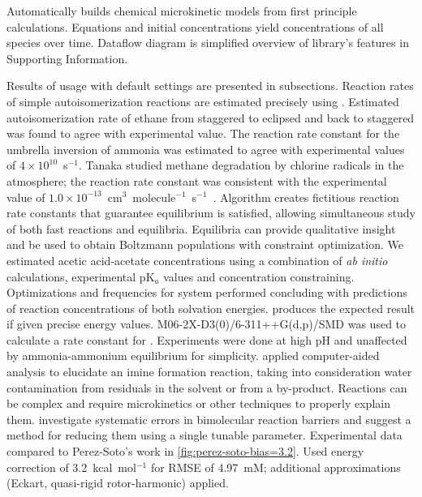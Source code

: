 Automatically builds chemical microkinetic models from first principle calculations.
Equations and initial concentrations yield concentrations of all species over time.
Dataflow diagram is simplified overview of library's features in Supporting Information.

Results of \overreact usage with default settings are presented in subsections.
Reaction rates of simple autoisomerization reactions are estimated precisely using \overreact.
Estimated autoisomerization rate of ethane from staggered to eclipsed and back to staggered was found to agree with experimental value.
The reaction rate constant for the umbrella inversion of ammonia was estimated to agree with experimental values of $4 \times 10^{10}$~s$^{-1}$.
Tanaka \cite{Tanaka_1996} studied methane degradation by chlorine radicals in the atmosphere; the reaction rate constant was consistent with the experimental value of $1.0 \times 10^{-13}$~cm$^3$~molecule$^{-1}$~s$^{-1}$~\cite{Burkholder_2020}.
Algorithm creates fictitious reaction rate constants that guarantee equilibrium is satisfied, allowing simultaneous study of both fast reactions and equilibria.
Equilibria can provide qualitative insight and be used to obtain Boltzmann populations with constraint optimization.
We estimated acetic acid-acetate concentrations using a combination of \emph{ab initio} calculations, experimental pK$_a$ values and  concentration constraining.
Optimizations and frequencies for  system performed concluding with predictions of reaction concentrations of both solvation energies.
\overreact produces the expected result if given precise energy values.
M06-2X-D3(0)/6-311++G(d,p)/SMD was used to calculate a rate constant for .
Experiments were done at high pH and unaffected by ammonia-ammonium equilibrium for simplicity.
\citeauthor{P_rez_Soto_2020} applied computer-aided analysis to elucidate an imine formation reaction, taking into consideration water contamination from residuals in the solvent or from a by-product.
Reactions can be complex and require microkinetics or other techniques to properly explain them.
\citeauthor{P_rez_Soto_2020} investigate systematic errors in bimolecular reaction barriers and suggest a method for reducing them using a single tunable parameter.
Experimental data compared to Perez-Soto's work in \cref{fig:perez-soto-bias=3.2}.
Used energy correction of 3.2~kcal~mol$^{-1}$ for RMSE of 4.97~mM; additional approximations (Eckart, quasi-rigid rotor-harmonic) applied.
